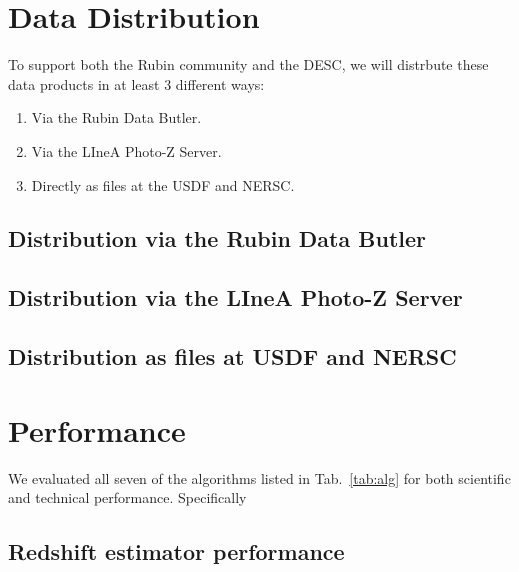 \section{Data Distribution}
\label{sec:distribution:0}

To support both the Rubin community and the DESC, we will distrbute these data products in at least 3 different ways:
\begin{enumerate}
\item{Via the Rubin Data Butler.}
\item{Via the LIneA Photo-Z Server.}
\item{Directly as files at the USDF and NERSC.}
\end{enumerate}

\subsection{Distribution via the Rubin Data Butler}
\label{sec:distribution:butler}


\subsection{Distribution via the LIneA Photo-Z Server}
\label{sec:distribution:linea}


\subsection{Distribution as files at USDF and NERSC}
\label{sec:distribution:files}



\section{Performance}
\label{sec:performance:0}

We evaluated all seven of the algorithms listed in Tab.~\ref{tab:alg} for both scientific and technical performance.   Specifically 

\subsection{Redshift estimator performance}
\label{sec: performance:pz}


